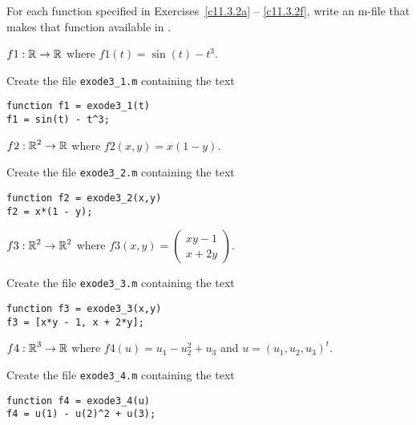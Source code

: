 \documentclass{ximera}
\begin{document}
\CEXER

\noindent For each function specified in Exercises~\ref{c11.3.2a} -- 
\ref{c11.3.2f}, write an m-file that makes that function available in 
\Matlabp.
\begin{exercise} \label{c11.3.2a}
$f1:\mbox{$\Bbb{R}$}\to\mbox{$\Bbb{R}$}$ where $f1(t)=\sin(t) - t^3$.

\begin{solution}

Create the file {\tt exode3\_1.m} containing the text
\begin{verbatim}
function f1 = exode3_1(t)
f1 = sin(t) - t^3;
\end{verbatim}

\end{solution}
\end{exercise}
\begin{exercise} \label{c11.3.2b}
$f2:\mbox{$\Bbb{R}$}^2\to\mbox{$\Bbb{R}$}$ where $f2(x,y)=x(1-y)$.

\begin{solution}

Create the file {\tt exode3\_2.m} containing the text
\begin{verbatim}
function f2 = exode3_2(x,y)
f2 = x*(1 - y);
\end{verbatim}

\end{solution}
\end{exercise}
\begin{exercise} \label{c11.3.2c}
$f3:\mbox{$\Bbb{R}$}^2\to\mbox{$\Bbb{R}$}^2$ where  
$f3(x,y)=\left(\begin{array}{c} xy-1\\x+2y\end{array}\right)$.

\begin{solution}

Create the file {\tt exode3\_3.m} containing the text
\begin{verbatim}
function f3 = exode3_3(x,y)
f3 = [x*y - 1, x + 2*y];
\end{verbatim}

\end{solution}
\end{exercise}
\begin{exercise} \label{c11.3.2d}
$f4:\mbox{$\Bbb{R}$}^3\to\mbox{$\Bbb{R}$}$ where $f4(u)=u_1-u_2^2 + u_3$ and $u=(u_1,u_2,u_3)^t$.

\begin{solution}

Create the file {\tt exode3\_4.m} containing the text
\begin{verbatim}
function f4 = exode3_4(u)
f4 = u(1) - u(2)^2 + u(3);
\end{verbatim}

\end{solution}
\end{exercise}
\end{document}
